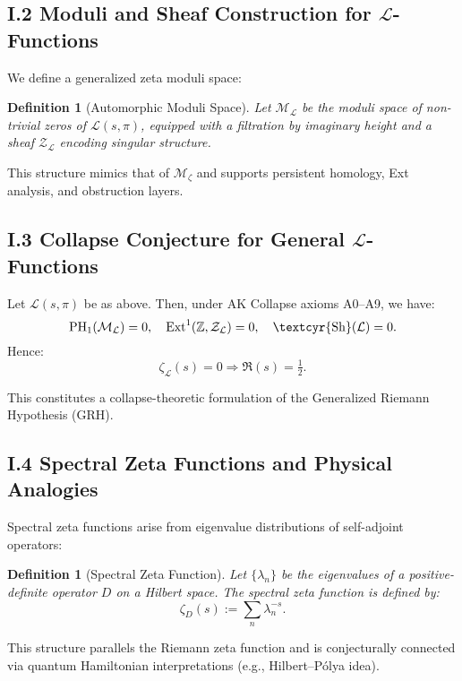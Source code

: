 \documentclass[11pt]{article}
\newtheorem{definition}[theorem]{Definition}
\newcommand{\Sha}{\text{\textcyr{Sh}}}
\begin{document}
\subsection*{I.2 Moduli and Sheaf Construction for $\mathcal{L}$-Functions}

We define a generalized zeta moduli space:

\begin{definition}[Automorphic Moduli Space]
Let $\mathcal{M}_{\mathcal{L}}$ be the moduli space of non-trivial zeros of $\mathcal{L}(s, \pi)$,  
equipped with a filtration by imaginary height and a sheaf $\mathcal{Z}_{\mathcal{L}}$ encoding singular structure.
\end{definition}

This structure mimics that of $\mathcal{M}_\zeta$ and supports persistent homology, Ext analysis, and obstruction layers.

\subsection*{I.3 Collapse Conjecture for General $\mathcal{L}$-Functions}

\begin{conjecture}
Let $\mathcal{L}(s, \pi)$ be as above. Then, under AK Collapse axioms A0–A9, we have:
\[
\mathrm{PH}_1(\mathcal{M}_{\mathcal{L}}) = 0, \quad \mathrm{Ext}^1(\mathbb{Z}, \mathcal{Z}_{\mathcal{L}}) = 0, \quad \Sha(\mathcal{L}) = 0.
\]
Hence:
\[
\zeta_{\mathcal{L}}(s) = 0 \Rightarrow \Re(s) = \tfrac{1}{2}.
\]
\end{conjecture}

This constitutes a collapse-theoretic formulation of the Generalized Riemann Hypothesis (GRH).

\subsection*{I.4 Spectral Zeta Functions and Physical Analogies}

Spectral zeta functions arise from eigenvalue distributions of self-adjoint operators:

\begin{definition}[Spectral Zeta Function]
Let $\{\lambda_n\}$ be the eigenvalues of a positive-definite operator $D$ on a Hilbert space.  
The spectral zeta function is defined by:
\[
\zeta_D(s) := \sum_{n} \lambda_n^{-s}.
\]
\end{definition}

This structure parallels the Riemann zeta function and is conjecturally connected via quantum Hamiltonian interpretations (e.g., Hilbert–Pólya idea).
\end{document}
